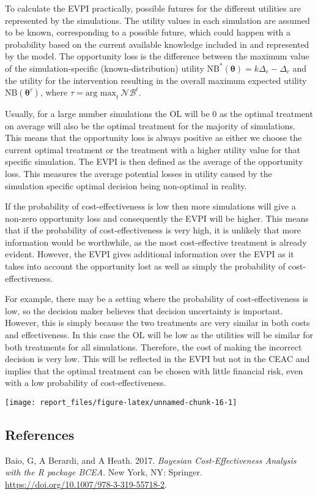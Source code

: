 \documentclass[
]{article}
\begin{document}
To calculate the EVPI practically, possible futures for the different
utilities are represented by the simulations. The utility values in each
simulation are assumed to be known, corresponding to a possible future,
which could happen with a probability based on the current available
knowledge included in and represented by the model. The opportunity loss
is the difference between the maximum value of the simulation-specific
(known-distribution) utility
\(\mbox{NB}^*(\bm\theta)=k\Delta_e-\Delta_c\) and the utility for the
intervention resulting in the overall maximum expected utility
\(\mbox{NB}(\bm\theta^\tau)\), where
\(\tau=\text{arg max}_t ~\mathcal{NB}^t\).

Usually, for a large number simulations the OL will be 0 as the optimal
treatment on average will also be the optimal treatment for the majority
of simulations. This means that the opportunity loss is always positive
as either we choose the current optimal treatment or the treatment with
a higher utility value for that specific simulation. The EVPI is then
defined as the average of the opportunity loss. This measures the
average potential losses in utility caused by the simulation specific
optimal decision being non-optimal in reality.

If the probability of cost-effectiveness is low then more simulations
will give a non-zero opportunity loss and consequently the EVPI will be
higher. This means that if the probability of cost-effectiveness is very
high, it is unlikely that more information would be worthwhile, as the
most cost-effective treatment is already evident. However, the EVPI
gives additional information over the EVPI as it takes into account the
opportunity lost as well as simply the probability of
cost-effectiveness.

For example, there may be a setting where the probability of
cost-effectiveness is low, so the decision maker believes that decision
uncertainty is important. However, this is simply because the two
treatments are very similar in both costs and effectiveness. In this
case the OL will be low as the utilities will be similar for both
treatments for all simulations. Therefore, the cost of making the
incorrect decision is very low. This will be reflected in the EVPI but
not in the CEAC and implies that the optimal treatment can be chosen
with little financial risk, even with a low probability of
cost-effectiveness.

\begin{center}\texttt{[image: report\_files/figure-latex/unnamed-chunk-16-1]} \end{center}

\hypertarget{references}{%
\subsection*{References}\label{references}}

\hypertarget{refs}{}
\leavevmode\hypertarget{ref-Baioetal:2017}{}%
Baio, G, A Berardi, and A Heath. 2017. \emph{Bayesian Cost-Effectiveness
Analysis with the R package BCEA}. New York, NY: Springer.
\url{https://doi.org/10.1007/978-3-319-55718-2}.
\end{document}
